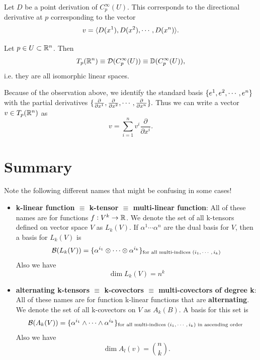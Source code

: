 \begin{observation}
	Let $ D $ be a point derivation of $ C_p^\infty (U) $. This corresponds to the directional derivative at $ p $ corresponding to the vector 
	\[ v = \langle D(x^1), D(x^2), \cdots, D(x^n) \rangle. \]
\end{observation}

\begin{observation}
	Let $ p \in U \subset \mathbb{R}^n $. Then 
	\[ T_p(\mathbb{R}^n) \equiv \mathcal{D}(C_p^\infty(U)) \equiv \mathbb{D}(C_p^\infty(U)), \]
	i.e. they are all isomorphic linear spaces.
\end{observation}

Because of the observation above, we identify the standard basis $ \{e^1, e^2, \cdots, e^n\} $ with the partial derivatives $ \{\frac{\partial}{\partial x^1}, \frac{\partial}{\partial x^2}, \cdots,\frac{\partial}{\partial x^n}\}. $ Thus we can write a vector $ v \in T_p(\mathbb{R}^n) $ as 
\[ v = \sum_{i=1}^{n} v^i \frac{\partial}{\partial x^i}. \]



\section{Summary}


\begin{summary}
	Note the following different names that might be confusing in some cases!
	\begin{itemize}
		\item \textbf{k-linear function $ \equiv $ k-tensor $ \equiv $ multi-linear function}: All of these names are for functions $ f: V^k \to \mathbb{R} $. We denote the set of all k-tensors defined on vector space $ V $ as $ L_k(V) $. If $ \alpha^1 \cdots \alpha^n $ are the dual basis for $ V $, then a basis for $ L_k(V) $ is
		\[ \mathcal{B}(L_k(V)) = \{\alpha^{i_1} \otimes \cdots \otimes \alpha^{i_k}\}_\text{for all multi-indices $ (i_1,\cdots,i_k) $} \]
		Also we have
		\[ \dim L_k(V) = n^k \]
		\item \textbf{alternating k-tensors $ \equiv $ k-covectors $ \equiv $ multi-covectors of degree k}: All of these names are for function k-linear functions that are \textbf{alternating}. We denote the set of all k-covectors on $ V $ as $ A_k(B) $. A basis for this set is
		\[ \mathcal{B}(A_k(V)) = \{\alpha^{i_1}\wedge \cdots \wedge \alpha^{i_k}\}_{\text{for all multi-indices $ (i_1,\cdots,i_k) $ in ascending order }} \]
		Also we have
		\[ \dim A_l(v) = \binom{n}{k}. \]
	\end{itemize}
\end{summary}

